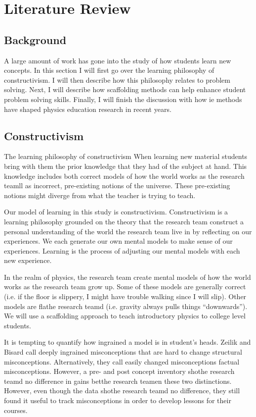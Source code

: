 \chapter[Literature Review]{Literature Review}

\section{Background}

A large amount of work has gone into the study of how students learn new concepts. In this section I will first go over the learning philosophy of constructivism. I will then describe how this philosophy relates to problem solving. Next, I will describe how scaffolding methods can help enhance student problem solving skills. Finally, I will finish the discussion with how \gls{ie} methods have shaped physics education research in recent years.

\section{Constructivism}

The learning philosophy of constructivism When learning new material students bring with them the prior knowledge that they had of the subject at hand. This knowledge includes both correct models of how the world works as the research teamll as incorrect, pre-existing notions of the universe. These pre-existing notions might diverge from what the teacher is trying to teach.

Our model of learning in this study is constructivism. Constructivism is a learning philosophy grounded on the theory that the research team construct a personal understanding of the world the research team live in by reflecting on our experiences. We each generate our own mental models to make sense of our experiences. Learning is the process of adjusting our mental models with each new experience.

In the realm of physics, the research team create mental models of how the world works as the research team grow up. Some of these models are generally correct (i.e. if the floor is slippery, I might have trouble walking since I will slip). Other models are flathe research teamd (i.e. gravity always pulls things “downwards”). We will use a scaffolding approach to teach introductory physics to college level students.

It is tempting to quantify how ingrained a model is in student's heads. Zeilik and Bisard call deeply ingrained misconceptions that are hard to change structural misconceptions. Alternatively, they call easily changed misconceptions factual misconceptions\cite{zeilik2000}. However, a pre- and post concept inventory shothe research teamd no difference in gains betthe research teamen these two distinctions. However, even though the data shothe research teamd no difference, they still found it useful to track misconceptions in order to develop lessons for their courses.

